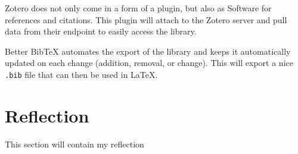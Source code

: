 Zotero does not only come in a form of a plugin, but also as Software for
references and citations. This plugin will attach to the Zotero server and pull
data from their endpoint to easily access the library.

Better BibTeX automates the export of the library and keeps it automatically
updated on each change (addition, removal, or change). This will export a nice
\texttt{.bib} file that can then be used in LaTeX.


\section{Reflection}
\label{s:Reflection}
This section will contain my reflection

